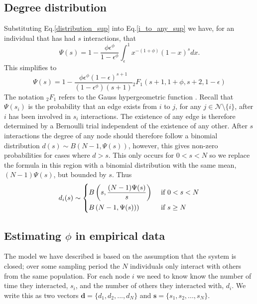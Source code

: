 \documentclass[10pt]{article}
\begin{document}
\begin{multicols}{2}
\subsection{Degree distribution}
\label{degree_distribution}
Substituting Eq.\eqref{distribution_sup} into Eq.\eqref{i_to_any_sup} we have, for an individual that has had $s$ interactions, that
\begin{equation}
\Psi(s)=1-\frac{\phi\epsilon^{\phi}}{1-\epsilon^{\phi}}\int_{\epsilon}^{1} x^{-(1+\phi)}(1-x)^{s}dx.
\end{equation}
This simplifies to
\begin{equation}
\label{hyper_solution_sup}
\Psi(s)=1-\frac{\phi\epsilon^{\phi}(1-\epsilon)^{s+1}}{(1-\epsilon^{\phi})(s+1)}{}_{2}F_{1}(s+1, 1+\phi, s+2, 1-\epsilon)
\end{equation}
The notation ${}_{2}F_{1}$ refers to the Gauss hypergeometric function \cite{absteg}. Recall that $\Psi(s_{i})$ is the probability that an edge exists from $i$ to $j$, for any $j\in \mathcal{N}\setminus\{i\}$, after $i$ has been involved in $s_{i}$ interactions. The existence of any edge is therefore determined by a Bernoulli trial independent of the existence of any other. After $s$ interactions the degree of any node should therefore follow a binomial distribution $d(s)\sim B(N-1,\Psi(s))$, however, this gives non-zero probabilities for cases where $d>s$. This only occurs for $0<s<N$ so we replace the formula in this region with a binomial distribution with the same mean, $(N-1)\Psi(s)$, but bounded by $s$. Thus 
\begin{equation}
\label{binoms}
d_{i}(s) \sim
   \begin{dcases}
    B\left(s,\frac{(N-1)\Psi(s)}{s}\right) & \text{ if }0<s<N\\
    B\left(N-1,\Psi(s))\right) & \text{ if } s \geq N
  \end{dcases}
\end{equation}
\subsection{Estimating $\phi$ in empirical data}
\label{fitting}
The model we have described is based on the assumption that the system is closed; over some sampling period the $N$ individuals only interact with others from the same population. For each node $i$ we need to know know the number of time they interacted, $s_{i}$, and the number of others they interacted with, $d_{i}$. We write this as two vectors $\textbf{d}=\{d_{1},d_{2},...,d_{N}\}$ and $\textbf{s}=\{s_{1},s_{2},...,s_{N}\}$.


\end{multicols}
\end{document}
